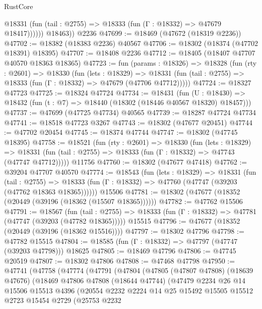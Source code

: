 \begin{lexlean}{RustCore}
\begin{coremodule}
              @18331 (fun (tail : @2755) => @18333 (fun (Γ : @18332) => @47679 @18417))))))
        @18463))
    @2236
@47699 := @18469 (@47672 (@18319 @2236))
@47702 := @18382 (@18383 @2236) @40567
@47706 := @18302 (@18374 (@47702 @18391) @18395)
@47707 := @18408 @2236
@47712 := @18405 (@18407 @47707 @40570 @18363 @18365)
@47723 := fun (params : @18326) =>
  @18328
    (fun (rty : @2601) =>
    @18330
      (fun (lets : @18329) =>
      @18331 (fun (tail : @2755) => @18333 (fun (Γ : @18332) => @47679 (@47706 @47712)))))
@47724 := @18327 @47723
@47725 := @18324 @47724
@47734 := @18431
    (fun (U : @18430) => @18432 (fun (t : @7) => @18440 (@18302 (@18446 @40567 @18320) @18457)))
@47737 := @47699 (@47725 @47734) @40565
@47739 := @18287 @47724 @47734
@47741 := @18518 @47723 @3267
@47743 := @18302 (@47677 @20451)
@47744 := @47702 @20454
@47745 := @18374 @47744
@47747 := @18302 (@47745 @18395)
@47758 := @18521
    (fun (rty : @2601) =>
    @18330
      (fun (lets : @18329) =>
      @18331 (fun (tail : @2755) => @18333 (fun (Γ : @18332) => @47743 (@47747 @47712)))))
    @11756
@47760 := @18302 (@47677 @47418)
@47762 := @39204 @47707 @40570
@47774 := @18543
    (fun (lets : @18329) =>
    @18331
      (fun (tail : @2755) =>
      @18333 (fun (Γ : @18332) => @47760 (@47747 (@39203 (@47762 @18363 @18365))))))
    @15506
@47781 := @18302 (@47677 (@18352 (@20449 (@39196 (@18362 (@15507 @18365))))))
@47782 := @47762 @15506
@47791 := @18567
    (fun (tail : @2755) => @18333 (fun (Γ : @18332) => @47781 (@47747 (@39203 (@47782 @18365)))))
    @15515
@47796 := @47677 (@18352 (@20449 (@39196 (@18362 @15516))))
@47797 := @18302 @47796
@47798 := @47782 @15515
@47804 := @18585 (fun (Γ : @18332) => @47797 (@47747 (@39203 @47798))) @18625
@47805 := @18469 @47796
@47806 := @47745 @20519
@47807 := @18302 @47806
@47808 := @47468 @47798
@47950 := @47741
    (@47758
      (@47774
        (@47791
          (@47804
            (@47805
              (@47807 @47808)
              (@18639 @47676)
              (@18469
                @47806
                @47808
                (@18644 @47744)
                (@47479
                  @2234
                  @26
                  @14
                  @15506
                  @15513
                  @4396
                  (@20554
                    @2232
                    @2224
                    @14
                    @25
                    @15492
                    @15505
                    @15512
                    @2723
                    @15454
                    @2729
                    (@25753
                      @2232

\end{coremodule}
\end{lexlean}
